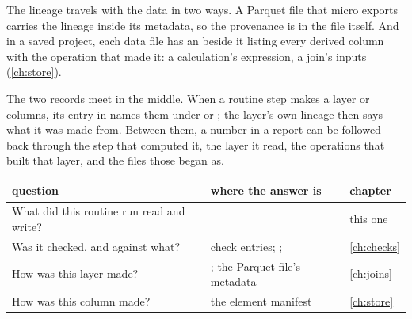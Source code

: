 The lineage travels with the data in two ways. A Parquet file that micro exports carries the lineage inside its metadata, so the provenance is in the file itself. And in a saved project, each data file has an  beside it listing every derived column with the operation that made it: a calculation's expression, a join's inputs (\cref{ch:store}).

The two records meet in the middle. When a routine step makes a layer or columns, its entry in  names them under  or ; the layer's own lineage then says what it was made from. Between them, a number in a report can be followed back through the step that computed it, the layer it read, the operations that built that layer, and the files those began as.

\begin{tabularx}{\linewidth}{@{}lLL@{}}\toprule
question & where the answer is & chapter \\ \midrule
What did this routine run read and write? &  & this one \\
Was it checked, and against what? & check entries; ;  & \cref{ch:checks} \\
How was this layer made? & ; the Parquet file's metadata & \cref{ch:joins} \\
How was this column made? & the element manifest & \cref{ch:store} \\
\bottomrule
\end{tabularx}
